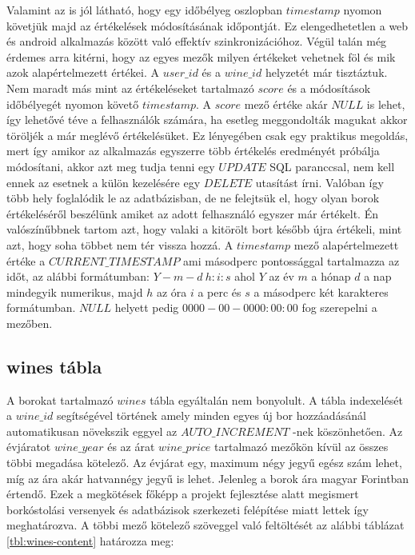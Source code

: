 \documentclass[12pt]{report}
\theoremstyle{definition}
\begin{document}
	Valamint az is jól látható, hogy egy időbélyeg oszlopban $timestamp$ nyomon követjük majd az értékelések módosításának időpontját. Ez elengedhetetlen a web és android alkalmazás között való effektív szinkronizációhoz. Végül talán még érdemes arra kitérni, hogy az egyes mezők milyen értékeket vehetnek föl és mik azok alapértelmezett értékei. A $user\_id$ és a $wine\_id$ helyzetét már tisztáztuk. Nem maradt más mint az értékeléseket tartalmazó $score$ és a módosítások időbélyegét nyomon követő $timestamp$. A $score$ mező értéke akár $NULL$ is lehet, így lehetővé téve a felhasználók számára, ha esetleg meggondolták magukat akkor töröljék a már meglévő értékelésüket. Ez lényegében csak egy praktikus megoldás, mert így amikor az alkalmazás egyszerre több értékelés eredményét próbálja módosítani, akkor azt meg tudja tenni egy $UPDATE$ SQL paranccsal, nem kell ennek az esetnek a külön kezelésére egy $DELETE$ utasítást írni. Valóban így több hely foglalódik le az adatbázisban, de ne felejtsük el, hogy olyan borok értékeléséről beszélünk amiket az adott felhasználó egyszer már értékelt. Én valószínűbbnek tartom azt, hogy valaki a kitörölt bort később újra értékeli, mint azt, hogy soha többet nem tér vissza hozzá. A $timestamp$ mező alapértelmezett értéke a $CURRENT\_TIMESTAMP$ ami másodperc pontossággal tartalmazza az időt, az alábbi formátumban: $Y-m-d\ h:i:s$ ahol $Y$ az év $m$ a hónap $d$ a nap mindegyik numerikus, majd $h$ az óra $i$ a perc és $s$ a másodperc két karakteres formátumban. $NULL$ helyett pedig $0000-00-00 00:00:00$ fog szerepelni a mezőben.
	
	\subsection{wines tábla}
	
	A borokat tartalmazó $wines$ tábla egyáltalán nem bonyolult. A tábla indexelését a \linebreak$wine\_id$ segítségével történek amely minden egyes új bor hozzáadásánál automatikusan növekszik eggyel az $AUTO\_INCREMENT$ -nek köszönhetően. Az évjáratot \linebreak$wine\_year$ és az árat $wine\_price$ tartalmazó mezőkön kívül az összes többi megadása kötelező. Az évjárat egy, maximum négy jegyű egész szám lehet, míg az ára akár hatvannégy jegyű is lehet. Jelenleg a borok ára magyar Forintban értendő. Ezek a megkötések főképp a projekt fejlesztése alatt megismert borkóstolási versenyek és adatbázisok szerkezeti felépítése miatt lettek így meghatározva. A többi mező kötelező szöveggel való feltöltését az alábbi táblázat \ref{tbl:wines-content} határozza meg:
	
\end{document}
